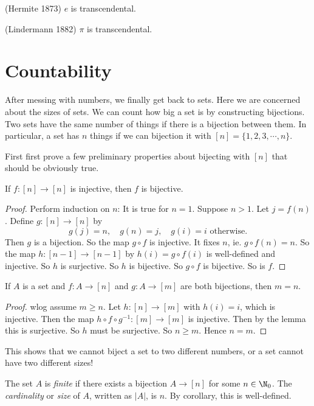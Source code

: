 \documentclass[a4paper]{article}
\begin{document}
\begin{thm}
  (Hermite 1873) $e$ is transcendental.
\end{thm}
\begin{thm}
  (Lindermann 1882) $\pi$ is transcendental.
\end{thm}

\section{Countability}
After messing with numbers, we finally get back to sets. Here we are concerned about the sizes of sets. We can count how big a set is by constructing bijections. Two sets have the same number of things if there is a bijection between them. In particular, a set has $n$ things if we can bijection it with $[n] = \{1, 2, 3, \cdots, n\}$.

First first prove a few preliminary properties about bijecting with $[n]$ that should be obviously true.

\begin{lemma}
  If $f:[n] \to [n]$ is injective, then $f$ is bijective.
\end{lemma}

\begin{proof}
  Perform induction on $n$: It is true for $n = 1$. Suppose $n > 1$. Let $j = f(n)$. Define $g: [n]\to [n]$ by
  \[
    g(j) = n,\quad g(n) = j, \quad g(i) = i \text{ otherwise}.
  \]
  Then $g$ is a bijection. So the map $g\circ f$ is injective. It fixes $n$, ie. $g\circ f(n) = n$. So the map $h:[n - 1]\to [n - 1]$ by $h(i) = g\circ f(i)$ is well-defined and injective. So $h$ is surjective. So $h$ is bijective. So $g\circ f$ is bijective. So is $f$.
\end{proof}

\begin{cor}
  If $A$ is a set and $f: A\to [n]$ and $g: A\to [m]$ are both bijections, then $m = n$.
\end{cor}

\begin{proof}
  wlog assume $m \geq n$. Let $h: [n]\to [m]$ with $h(i) = i$, which is injective. Then the map $h\circ f\circ g^{-1}: [m]\to [m]$ is injective. Then by the lemma this is surjective. So $h$ must be surjective. So $n\geq m$. Hence $n = m$.
\end{proof}
This shows that we cannot biject a set to two different numbers, or a set cannot have two different sizes!

\begin{defi}
  The set $A$ is \emph{finite} if there exists a bijection $A\to [n]$ for some $n\in\N_0$. The \emph{cardinality} or \emph{size} of $A$, written as $|A|$, is $n$. By corollary, this is well-defined.
\end{defi}
\end{document}
